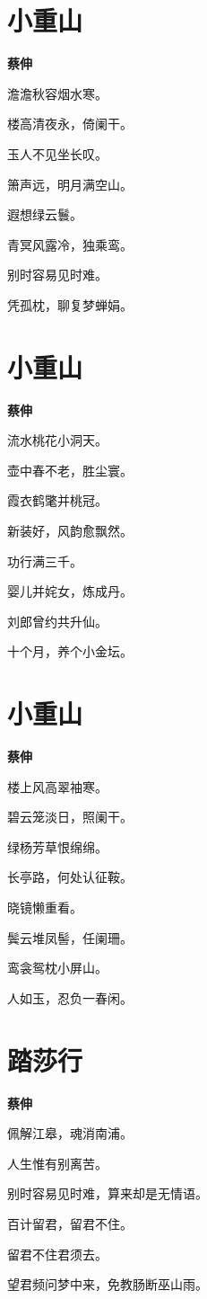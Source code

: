 \documentclass[12pt,a4paper]{ctexbook}
\begin{document}
\section{小重山}
\textbf{蔡伸}\par\vspace{0.5em}
澹澹秋容烟水寒。\par
楼高清夜永，倚阑干。\par
玉人不见坐长叹。\par
箫声远，明月满空山。\par
遐想绿云鬟。\par
青冥风露冷，独乘鸾。\par
别时容易见时难。\par
凭孤枕，聊复梦蝉娟。\par

\section{小重山}
\textbf{蔡伸}\par\vspace{0.5em}
流水桃花小洞天。\par
壶中春不老，胜尘寰。\par
霞衣鹤氅并桃冠。\par
新装好，风韵愈飘然。\par
功行满三千。\par
婴儿并姹女，炼成丹。\par
刘郎曾约共升仙。\par
十个月，养个小金坛。\par

\section{小重山}
\textbf{蔡伸}\par\vspace{0.5em}
楼上风高翠袖寒。\par
碧云笼淡日，照阑干。\par
绿杨芳草恨绵绵。\par
长亭路，何处认征鞍。\par
晓镜懒重看。\par
鬓云堆凤髻，任阑珊。\par
鸾衾鸳枕小屏山。\par
人如玉，忍负一春闲。\par

\section{踏莎行}
\textbf{蔡伸}\par\vspace{0.5em}
佩解江皋，魂消南浦。\par
人生惟有别离苦。\par
别时容易见时难，算来却是无情语。\par
百计留君，留君不住。\par
留君不住君须去。\par
望君频问梦中来，免教肠断巫山雨。\par
\end{document}
